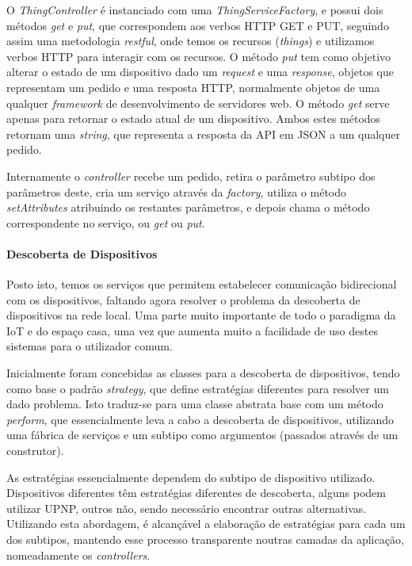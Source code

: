O \textit{ThingController} é instanciado com uma \textit{ThingServiceFactory}, e possui dois métodos \textit{get} e \textit{put}, que correspondem aos verbos HTTP GET e PUT, seguindo assim uma metodologia \textit{restful}, onde temos os recursos (\textit{things}) e utilizamos verbos HTTP para interagir com os recursos. O método \textit{put} tem como objetivo alterar o estado de um dispositivo dado um \textit{request} e uma \textit{response}, objetos que representam um pedido e uma resposta HTTP, normalmente objetos de uma qualquer \textit{framework} de desenvolvimento de servidores web. O método \textit{get} serve apenas para retornar o estado atual de um dispositivo. Ambos estes métodos retornam uma \textit{string}, que representa a resposta da API em JSON a um qualquer pedido.

Internamente o \textit{controller} recebe um pedido, retira o parâmetro subtipo dos parâmetros deste, cria um serviço através da \textit{factory}, utiliza o método \textit{setAttributes} atribuindo os restantes parâmetros, e depois chama o método correspondente no serviço, ou \textit{get} ou \textit{put}.

\newpage

%
%
%
%

\paragraph*{Descoberta de Dispositivos}

Posto isto, temos os serviços que permitem estabelecer comunicação bidirecional com os dispositivos, faltando agora resolver o problema da descoberta de dispositivos na rede local. Uma parte muito importante de todo o paradigma da IoT e do espaço casa, uma vez que aumenta muito a facilidade de uso destes sistemas para o utilizador comum.

Inicialmente foram concebidas as classes para a descoberta de dispositivos, tendo como base o padrão \textit{strategy}, que define estratégias diferentes para resolver um dado problema. Isto traduz-se para uma classe abstrata base com um método \textit{perform}, que essencialmente leva a cabo a descoberta de dispositivos, utilizando uma fábrica de serviços e um subtipo como argumentos (passados através de um construtor).

As estratégias essencialmente dependem do subtipo de dispositivo utilizado. Dispositivos diferentes têm estratégias diferentes de descoberta, alguns podem utilizar UPNP, outros não, sendo necessário encontrar outras alternativas. Utilizando esta abordagem, é alcançável a elaboração de estratégias para cada um dos subtipos, mantendo esse processo transparente noutras camadas da aplicação, nomeadamente os \textit{controllers}.

